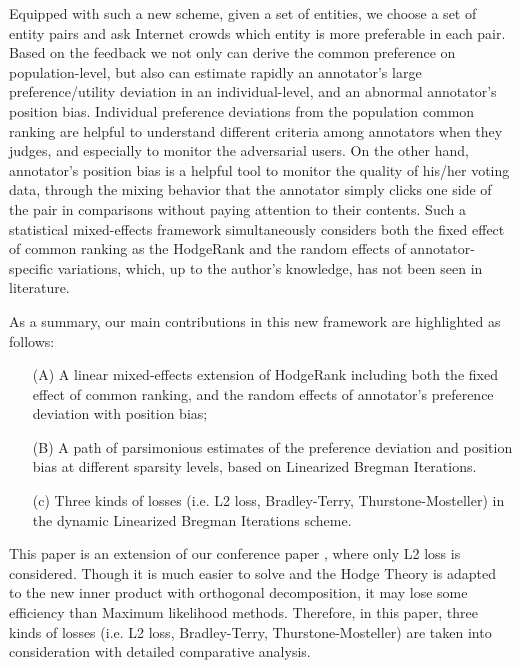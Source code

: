 \documentclass[10pt,journal,cspaper,compsoc]{IEEEtran}
\begin{document}
Equipped with such a new scheme, given a set of entities, we choose a
set of entity pairs and ask Internet crowds which entity is more preferable
in each pair. Based on the feedback we not only can derive the common preference on population-level, but also can estimate rapidly an annotator's large preference/utility deviation in an individual-level, and an abnormal annotator's position bias. Individual preference deviations from the population common ranking are helpful to understand different criteria among annotators when they judges, and especially to monitor the adversarial users. On the other hand, annotator's position bias is a helpful tool to monitor the quality of his/her voting data, through the mixing behavior that the annotator simply clicks one side of the pair in comparisons without paying attention to their contents. Such a statistical mixed-effects framework simultaneously considers both the fixed effect of common ranking as the HodgeRank and the random effects of annotator-specific variations, which, up to the author's knowledge, has not been seen in literature.

As a summary, our main contributions in this new framework are highlighted as follows:

\begin{itemize}
\item[(A)] A linear mixed-effects extension of HodgeRank including both the fixed effect of common ranking, and the random effects of annotator's preference deviation with position bias;
\item[(B)] A path of parsimonious estimates of the preference deviation and position bias at different sparsity levels, based on Linearized Bregman Iterations.
\item[(c)] Three kinds of losses (i.e. L2 loss, Bradley-Terry, Thurstone-Mosteller) in the dynamic Linearized Bregman Iterations scheme.
\end{itemize}

This paper is an extension of our conference paper
\cite{mm16}, where only L2 loss is considered. Though it is much easier to solve and the Hodge Theory is adapted to the new inner product with orthogonal decomposition, it may lose some efficiency than Maximum likelihood methods. Therefore, in this paper, three kinds of losses (i.e. L2 loss, Bradley-Terry, Thurstone-Mosteller) are taken into consideration with detailed comparative analysis.
\end{document}
